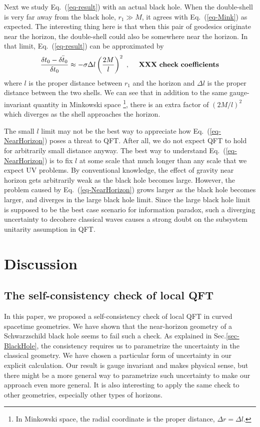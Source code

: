 \documentclass[aps,showpacs,twocolumn,floats,prd,superscriptaddress,nofootinbib]{revtex4-1}
\begin{document}
Next we study Eq.~(\ref{eq-result}) with an actual black hole. 
When the double-shell is very far away from the black hole, $r_1\gg M$, it agrees with Eq.~(\ref{eq-Mink}) as expected. 
The interesting thing here is that when this pair of geodesics originate near the horizon, the double-shell could also be somewhere near the horizon. 
In that limit, Eq.~(\ref{eq-result}) can be approximated by
\begin{equation}
\frac{\delta t_0 - \bar{\delta t_0}}{\delta t_0} \approx
- \sigma \Delta l \left(\frac{2M}{l}\right)^2~, \ \ \ \ {\rm \bf XXX \ check \ coefficients}
\label{eq-NearHorizon}
\end{equation}
where $l$ is the proper distance between $r_1$ and the horizon and $\Delta l$ is the proper distance between the two shells. 
We can see that in addition to the same gauge-invariant quantity in Minkowski space
\footnote{In Minkowski space, the radial coordinate is the proper distance, $\Delta r=\Delta l$.}, 
there is an extra factor of $(2M/l)^2$ which diverges as the shell approaches the horizon.

The small $l$ limit may not be the best way to appreciate how Eq.~(\ref{eq-NearHorizon}) poses a threat to QFT. 
After all, we do not expect QFT to hold for arbitrarily small distance anyway. 
The best way to understand Eq.~(\ref{eq-NearHorizon}) is to fix $l$ at some scale that much longer than any scale that we expect UV problems. 
By conventional knowledge, the effect of gravity near horizon gets arbitrarily weak as the black hole becomes large. 
However, the problem caused by Eq.~(\ref{eq-NearHorizon}) grows larger as the black hole becomes larger, and diverges in the large black hole limit.
Since the large black hole limit is supposed to be the best case scenario for information paradox, such a diverging uncertainty to decohere classical waves causes a strong doubt on the subsystem unitarity assumption in QFT.


\section{Discussion}
\label{sec-dis}

\subsection{The self-consistency check of local QFT}

In this paper, we proposed a self-consistency check of local QFT in curved spacetime geometries.
We have shown that the near-horizon geometry of a Schwarzschild black hole seems to fail such a check.
As explained in Sec.\ref{sec-BlackHole}, the consistency requires us to parametrize the uncertainty in the classical geometry.
We have chosen a particular form of uncertainty in our explicit calculation.
Our result is gauge invariant and makes physical sense, but there might be a more general way to parametrize such uncertainty to make our approach even more general.
It is also interesting to apply the same check to other geometries, especially other types of horizons.
\end{document}
